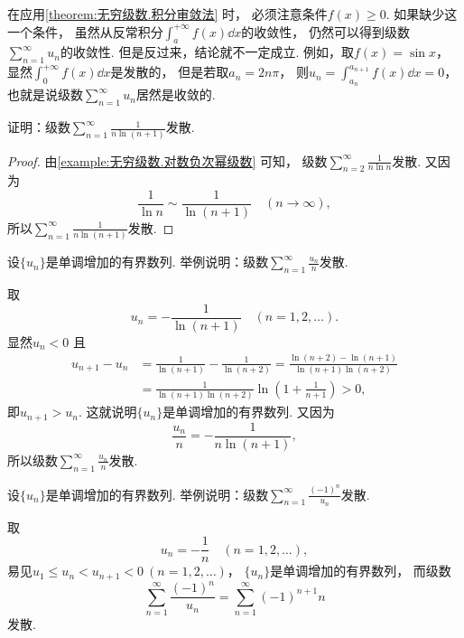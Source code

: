 \begin{remark}
在应用\cref{theorem:无穷级数.积分审敛法} 时，
必须注意条件\(f(x)\geq0\).
如果缺少这一个条件，
虽然从反常积分\(\int_a^{+\infty} f(x) \dd{x}\)的收敛性，
仍然可以得到级数\(\sum_{n=1}^\infty u_n\)的收敛性.
但是反过来，结论就不一定成立.
例如，取\(f(x) = \sin x\)，
显然\(\int_0^{+\infty} f(x) \dd{x}\)是发散的，
但是若取\(a_n = 2n\pi\)，
则\(u_n = \int_{a_n}^{a_{n+1}} f(x) \dd{x} = 0\)，
也就是说级数\(\sum_{n=1}^\infty u_n\)居然是收敛的.
\end{remark}

\begin{example}
证明：级数\(\sum_{n=1}^\infty \frac1{n \ln(n+1)}\)发散.
\begin{proof}
由\cref{example:无穷级数.对数负次幂级数} 可知，
级数\(\sum_{n=2}^\infty \frac1{n \ln n}\)发散.
又因为\[
	\frac1{\ln n} \sim \frac1{\ln(n+1)}
	\quad(n\to\infty),
\]
所以\(\sum_{n=1}^\infty \frac1{n \ln(n+1)}\)发散.
\end{proof}
\end{example}

\begin{example}
设\(\{u_n\}\)是单调增加的有界数列.
举例说明：级数\(\sum_{n=1}^\infty \frac{u_n}{n}\)发散.
\begin{solution}
取\[
	u_n = -\frac1{\ln(n+1)}
	\quad(n=1,2,\dotsc).
\]
显然\(u_n<0\)
且\begin{align*}
	u_{n+1} - u_n
	&= \frac1{\ln(n+1)} - \frac1{\ln(n+2)}
	= \frac{\ln(n+2)-\ln(n+1)}{\ln(n+1) \ln(n+2)} \\
	&= \frac1{\ln(n+1) \ln(n+2)} \ln\left(1+\frac1{n+1}\right)
	> 0,
\end{align*}
即\(u_{n+1} > u_n\).
这就说明\(\{u_n\}\)是单调增加的有界数列.
又因为\[
	\frac{u_n}{n}
	= -\frac1{n \ln(n+1)},
\]
所以级数\(\sum_{n=1}^\infty \frac{u_n}{n}\)发散.
\end{solution}
\end{example}

\begin{example}
设\(\{u_n\}\)是单调增加的有界数列.
举例说明：级数\(\sum_{n=1}^\infty \frac{(-1)^n}{u_n}\)发散.
\begin{solution}
取\[
	u_n = -\frac1n
	\quad(n=1,2,\dotsc),
\]
易见\(u_1 \leq u_n < u_{n+1} < 0\ (n=1,2,\dotsc)\)，
\(\{u_n\}\)是单调增加的有界数列，
而级数\[
	\sum_{n=1}^\infty \frac{(-1)^n}{u_n}
	= \sum_{n=1}^\infty (-1)^{n+1} n
\]发散.
\end{solution}
\end{example}
